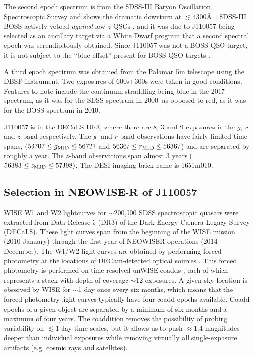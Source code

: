 \documentclass[11pt,a4paper]{article}
\begin{document}
The second epoch spectrum is from the SDSS-III Baryon Oscillation
Spectroscopic Survey \citep[BOSS; ][]{Dawson2013} and shows the dramatic
downturn at $\lesssim$4300\AA\ .  SDSS-III BOSS actively vetoed {\it
against} low-$z$ QSOs \citep{Ross2012}, and it was due to J110057 being
selected as an ancillary target via a White Dwarf program
\citep{Kepler2015, Kepler2016} that a second spectral epoch was serendipitously
obtained.  Since J110057 was not a BOSS QSO target, it is not subject
to the ``blue offset'' present for BOSS QSO targets \citep{Margala2016}.

A third epoch spectrum was obtained from the Palomar 5m telescope
using the DBSP instrument.  Two exposures of 600s+300s were taken in
good conditions. Features to note include the continuum straddling
\mgii being blue in the 2017 spectrum, as it was for the SDSS spectrum
in 2000, as opposed to red, as it was for the BOSS spectrum in 2010.

J110057 is in the DECaLS DR3, where there are 8, 3 and 9 exposures in
the $g$, $r$ and $z$-band respectively. The $g$- and $r$-band
observations have fairly limited time spans, ($56707 \leq g_{\rm MJD}
\leq 56727$ and $56367 \leq r_{\rm MJD} \leq 56367$) and are separated
by roughly a year. The $z$-band observations span almost 3 years
($56383 \leq z_{\rm MJD} \leq 57398)$.  The DESI imaging brick name is
1651m010.


\subsection*{Selection in NEOWISE-R of J110057}

WISE W1 and W2 lightcurves for $\sim$200,000 SDSS spectroscopic
quasars were extracted from Data Release 3 (DR3) of the Dark Energy
Camera Legacy Survey (DECaLS). These light curves span from the
beginning of the WISE mission (2010 January) through the first-year of
NEOWISER operations (2014 December). The W1/W2 light curves are
obtained by performing forced photometry at the locations of
DECam-detected optical sources \citep{Lang2014, Meisner2017a,
Meisner2017b}.  This forced photometry is performed on time-resolved
unWISE coadds \citep{Lang2014}, each of which represents a stack with
depth of coverage $\sim$12 exposures. A given sky location is observed
by WISE for $\sim$1 day once every six months, which means that the
forced photometry light curves typically have four coadd epochs
available. Coadd epochs of a given object are separated by a minimum
of six months and a maximum of four years. The coaddition removes the
possibility of probing variability on $\lesssim$1 day time scales, but
it allows us to push $\approx$1.4 magnitudes deeper than individual
exposures while removing virtually all single-exposure artifacts
(e.g. cosmic rays and satellites).
\end{document}
